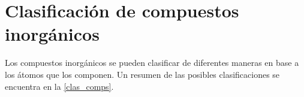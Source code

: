 \section{Clasificación de compuestos inorgánicos}

Los compuestos inorgánicos se pueden clasificar de diferentes maneras en base a los átomos que los componen. Un resumen de las posibles clasificaciones se encuentra en la \autoref{clas_comps}.

    


